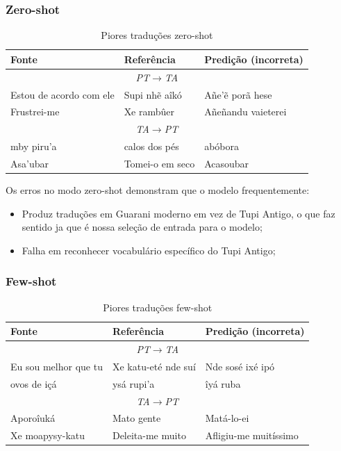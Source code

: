 \documentclass[12pt,a4paper]{article}
\begin{document}
\subsubsection{Zero-shot}

\begin{table}[H]
\centering
\small
\begin{tabular}{p{3.5cm}p{3.5cm}p{4cm}}
\toprule
\textbf{Fonte} & \textbf{Referência} & \textbf{Predição (incorreta)} \\
\midrule
\multicolumn{3}{c}{\textit{PT$\rightarrow$TA}} \\
Estou de acordo com ele & Supi nhẽ aîkó & Añe'ẽ porã hese \\
Frustrei-me & Xe rambûer & Añeñandu vaieterei \\
\midrule
\multicolumn{3}{c}{\textit{TA$\rightarrow$PT}} \\
mby piru'a & calos dos pés & abóbora \\
Asa'ubar & Tomei-o em seco & Acasoubar \\
\bottomrule
\end{tabular}
\caption{Piores traduções zero-shot}
\end{table}

Os erros no modo zero-shot demonstram que o modelo frequentemente:
\begin{itemize}
    \item Produz traduções em Guarani moderno em vez de Tupi Antigo, o que faz sentido ja que é nossa seleção de entrada para o modelo;
    \item Falha em reconhecer vocabulário específico do Tupi Antigo;
\end{itemize}

\subsubsection{Few-shot}

\begin{table}[H]
\centering
\small
\begin{tabular}{p{3.5cm}p{3.5cm}p{4cm}}
\toprule
\textbf{Fonte} & \textbf{Referência} & \textbf{Predição (incorreta)} \\
\midrule
\multicolumn{3}{c}{\textit{PT$\rightarrow$TA}} \\
Eu sou melhor que tu & Xe katu-eté nde suí & Nde sosé ixé ipó \\
ovos de içá & ysá rupi'a & îyá ruba \\
\midrule
\multicolumn{3}{c}{\textit{TA$\rightarrow$PT}} \\
Aporoîuká & Mato gente & Matá-lo-ei \\
Xe moapysy-katu & Deleita-me muito & Afligiu-me muitíssimo \\
\bottomrule
\end{tabular}
\caption{Piores traduções few-shot}
\end{table}
\end{document}
